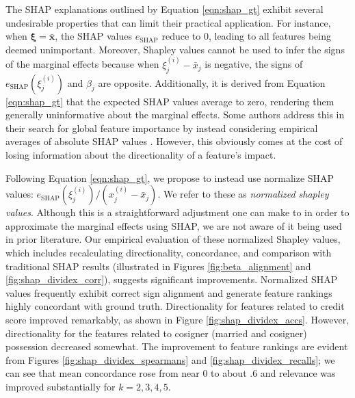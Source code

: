 \documentclass[mnsc,blindrev]{informs3}
\begin{document}
            
The SHAP explanations outlined by Equation \ref{eqn:shap_gt} exhibit several undesirable properties that can limit their practical application. For instance, when $\boldsymbol{\xi}=\bar{\mathbf{x}}$, the SHAP values $e_\text{SHAP}$ reduce to 0, leading to all features being deemed unimportant. Moreover, Shapley values cannot be used to infer the signs of the marginal effects because when $\xi^{(i)}_j - \bar{x}_j$ is negative, the signs of $e_{\text{SHAP}}(\xi^{(i)}_j)$ and $\beta_j$ are opposite. Additionally, it is derived from Equation \ref{eqn:shap_gt} that the expected SHAP values average to zero, rendering them generally uninformative about the marginal effects. Some authors address this in their search for global feature importance by instead considering empirical averages of absolute SHAP values \cite{lenaers23rent,maeng23vr,guenther2023useful}. However, this obviously comes at the cost of losing information about the directionality of a feature's impact.

             Following Equation \ref{eqn:shap_gt}, we propose to instead use normalize SHAP values: $e_{\text{SHAP}}(\xi^{(i)}_j) / (x^{(i)}_j - \bar{x}_j)$. We refer to these as \emph{normalized shapley values}. Although this is a straightforward adjustment one can make to in order to approximate the marginal effects using SHAP, we are not aware of it being used in prior literature.  Our empirical evaluation of these normalized Shapley values, which includes recalculating directionality, concordance, and comparison with traditional SHAP results (illustrated in Figures \ref{fig:beta_alignment} and \ref{fig:shap_dividex_corr}), suggests significant improvements. Normalized SHAP values frequently exhibit correct sign alignment and generate feature rankings highly concordant with ground truth. Directionality for features related to credit score improved remarkably, as shown in Figure \ref{fig:shap_dividex_accs}. However, directionality for the features related to cosigner (married and cosigner) possession decreased somewhat. The improvement to feature rankings are evident from Figures \ref{fig:shap_dividex_spearmans} and \ref{fig:shap_dividex_recalls}; we can see that mean concordance rose from near 0 to about .6 and relevance was improved substantially for $k=2,3,4,5$. 
             
\end{document}
